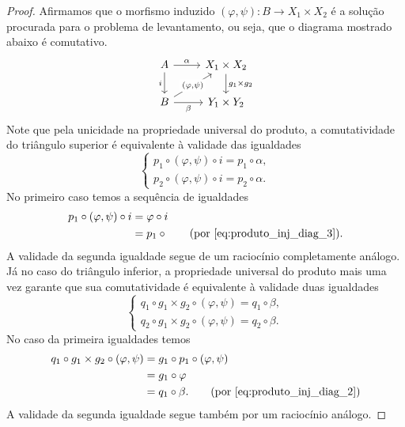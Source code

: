 \begin{proof}
  Afirmamos que o morfismo induzido $(\varphi,\psi): B \to X_1 \times X_2$ é a solução procurada para o problema de levantamento, ou seja, que o diagrama mostrado abaixo é comutativo.
  \begin{displaymath}
    \begin{tikzcd}
      A
      \arrow[r, "\alpha"]
      \arrow[d, "i" swap]
      & X_1 \times X_2
      \arrow[d, "g_1 \times g_2"]
      \\ B
      \arrow[r, "\beta" swap]
      \arrow[ru, "{(\varphi,\psi)}" description]
      & Y_1 \times Y_2
    \end{tikzcd}
  \end{displaymath}
  Note que pela unicidade na propriedade universal do produto, a comutatividade do triângulo superior é equivalente à validade das igualdades
  \begin{displaymath}
    \begin{cases}
      p_1 \circ (\varphi,\psi) \circ i = p_1 \circ \alpha, \\
      p_2 \circ (\varphi,\psi) \circ i = p_2 \circ \alpha.
    \end{cases}
  \end{displaymath}
  No primeiro caso temos a sequência de igualdades
  \begin{align*}
    p_1 \circ (\varphi,\psi) \circ i
    & = \varphi \circ i \\
    & = p_1 \circ
    \tag{por \eqref{eq:produto_inj_diag_3}}.
  \end{align*}
  A validade da segunda igualdade segue de um raciocínio completamente análogo.
  Já no caso do triângulo inferior, a propriedade universal do produto mais uma vez garante que sua comutatividade é equivalente à validade duas igualdades
  \begin{displaymath}
    \begin{cases}
      q_1 \circ g_1 \times g_2 \circ (\varphi,\psi) = q_1 \circ \beta, \\
      q_2 \circ g_1 \times g_2 \circ (\varphi,\psi) = q_2 \circ \beta.
    \end{cases}
  \end{displaymath}
  No caso da primeira igualdades temos
  \begin{align*}
    q_1 \circ g_1 \times g_2 \circ (\varphi,\psi)
    & = g_1 \circ p_1 \circ (\varphi,\psi) \\
    & = g_1 \circ \varphi \\
    & = q_1 \circ \beta.
    \tag{por \eqref{eq:produto_inj_diag_2}}
  \end{align*}
  A validade da segunda igualdade segue também por um raciocínio análogo.
\end{proof}

